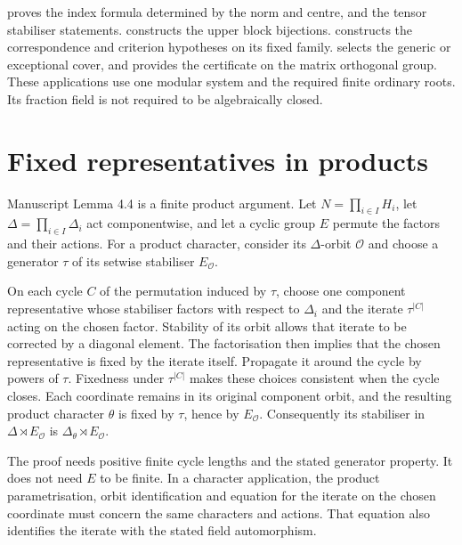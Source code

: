 \begin{implementation}
 proves the index formula
determined by the norm and centre, and the tensor stabiliser statements.
 constructs the upper
block bijections. 
constructs the correspondence and criterion hypotheses on its fixed
family.  selects the generic
or exceptional cover, and  provides
the certificate on the matrix orthogonal group. These applications
use one modular system and the required finite ordinary roots.
Its fraction field is not required to be algebraically closed.
\end{implementation}

\section{Fixed representatives in products}

Manuscript Lemma 4.4 is a finite product argument. Let
$N=\prod_{i\in I}H_i$, let $\Delta=\prod_{i\in I}\Delta_i$ act
componentwise, and let a cyclic group $E$ permute the factors and their
actions. For a product character, consider its $\Delta$-orbit
$\mathcal O$ and choose a generator $\tau$ of its setwise stabiliser
$E_{\mathcal O}$.

On each cycle $C$ of the permutation induced by $\tau$, choose one
component representative whose stabiliser factors with respect to
$\Delta_i$ and the iterate $\tau^{|C|}$ acting on the chosen factor.
Stability of its orbit allows that iterate to be corrected by a diagonal element. The
factorisation then implies that the chosen representative is fixed by
the iterate itself. Propagate it around the cycle by powers of $\tau$.
Fixedness under $\tau^{|C|}$ makes these choices consistent when the cycle
closes. Each coordinate remains in its original component orbit, and
the resulting product character $\theta$ is fixed by $\tau$, hence by
$E_{\mathcal O}$.
Consequently its stabiliser in $\Delta\rtimes E_{\mathcal O}$ is
$\Delta_\theta\rtimes E_{\mathcal O}$.

The proof needs positive finite cycle lengths and the stated generator
property. It does not need $E$ to be finite. In a character application,
the product parametrisation, orbit identification and equation for the
iterate on the chosen coordinate must concern the same characters and actions.
That equation also identifies the iterate with the stated field automorphism.

